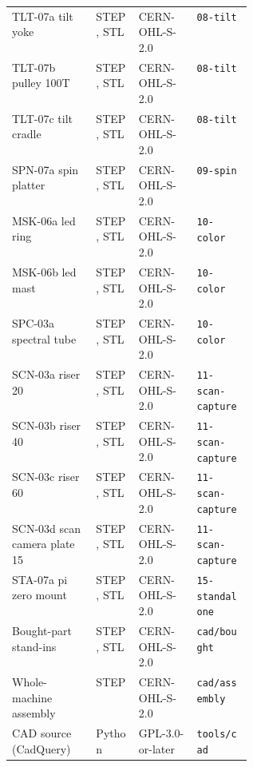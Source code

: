 \begin{tabular}{p{0.35\linewidth}lll}
TLT-07a tilt yoke & STEP, STL & CERN-OHL-S-2.0 & \texttt{08-tilt} \\
TLT-07b pulley 100T & STEP, STL & CERN-OHL-S-2.0 & \texttt{08-tilt} \\
TLT-07c tilt cradle & STEP, STL & CERN-OHL-S-2.0 & \texttt{08-tilt} \\
SPN-07a spin platter & STEP, STL & CERN-OHL-S-2.0 & \texttt{09-spin} \\
MSK-06a led ring & STEP, STL & CERN-OHL-S-2.0 & \texttt{10-color} \\
MSK-06b led mast & STEP, STL & CERN-OHL-S-2.0 & \texttt{10-color} \\
SPC-03a spectral tube & STEP, STL & CERN-OHL-S-2.0 & \texttt{10-color} \\
SCN-03a riser 20 & STEP, STL & CERN-OHL-S-2.0 & \texttt{11-scan-capture} \\
SCN-03b riser 40 & STEP, STL & CERN-OHL-S-2.0 & \texttt{11-scan-capture} \\
SCN-03c riser 60 & STEP, STL & CERN-OHL-S-2.0 & \texttt{11-scan-capture} \\
SCN-03d scan camera plate 15 & STEP, STL & CERN-OHL-S-2.0 & \texttt{11-scan-capture} \\
STA-07a pi zero mount & STEP, STL & CERN-OHL-S-2.0 & \texttt{15-standalone} \\
Bought-part stand-ins & STEP, STL & CERN-OHL-S-2.0 & \texttt{cad/bought} \\
Whole-machine assembly & STEP & CERN-OHL-S-2.0 & \texttt{cad/assembly} \\
CAD source (CadQuery) & Python & GPL-3.0-or-later & \texttt{tools/cad} \\
\end{tabular}

